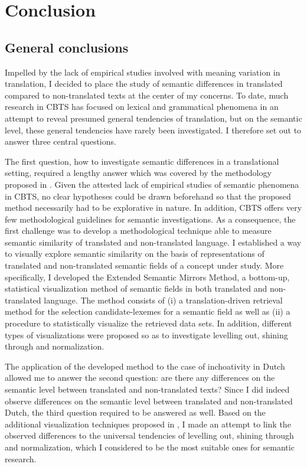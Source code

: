 \chapter{Conclusion}
\section{\label{sec:6.1}  General conclusions}

Impelled by the lack of empirical studies involved with meaning variation in translation, I decided to place the study of semantic differences in translated compared to non-translated texts at the center of my concerns. To date, much research in CBTS has focused on lexical and grammatical phenomena in an attempt to reveal presumed general tendencies of translation, but on the semantic level, these general tendencies have rarely been investigated. I therefore set out to answer three central questions.



The first question, how to investigate semantic differences in a translational setting, required a lengthy answer which was covered by the methodology proposed in . Given the attested lack of empirical studies of semantic phenomena in CBTS, no clear hypotheses could be drawn beforehand so that the proposed method necessarily had to be explorative in nature. In addition, CBTS offers very few methodological guidelines for semantic investigations. As a consequence, the first challenge was to develop a methodological technique able to measure semantic similarity of translated and non-translated language. I established a way to visually explore semantic similarity on the basis of representations of translated and non-translated semantic fields of a concept under study. More specifically, I developed the Extended Semantic Mirrors Method, a bottom-up, statistical visualization method of semantic fields in both translated and non-translated language. The method consists of (i) a translation-driven retrieval method for the selection candidate-lexemes for a semantic field as well as (ii) a procedure to statistically visualize the retrieved data sets. In addition, different types of visualizations were proposed so as to investigate levelling out, shining through and normalization.



The application of the developed method to the case of inchoativity in Dutch allowed me to answer the second question: are there any differences on the semantic level between translated and non-translated texts? Since I did indeed observe differences on the semantic level between translated and non-translated Dutch, the third question required to be answered as well. Based on the additional visualization techniques proposed in , I made an attempt to link the observed differences to the universal tendencies of levelling out, shining through and normalization, which I considered to be the most suitable ones for semantic research.



